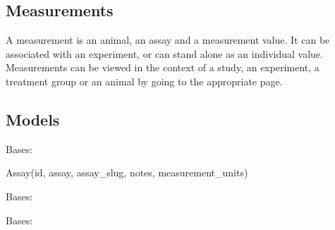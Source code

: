 \documentclass[letterpaper,10pt,english]{sphinxmanual}
\begin{document}
\subsection{Measurements}
\label{api:measurements}
A measurement is an animal, an assay and a measurement value.  It can be associated with an experiment, or can stand alone as an individual value.  Measurements can be viewed in the context of a study, an experiment, a treatment group or an animal by going to the appropriate page.


\subsection{Models}
\label{api:module-mousedb.data.models}\label{api:models}

\begin{fulllineitems}
\label{api:mousedb.data.models.Assay}
Bases: 

Assay(id, assay, assay\_slug, notes, measurement\_units)

\begin{fulllineitems}
\label{api:mousedb.data.models.Assay.DoesNotExist}
Bases: 

\end{fulllineitems}


\begin{fulllineitems}
\label{api:mousedb.data.models.Assay.MultipleObjectsReturned}
Bases: 

\end{fulllineitems}


\begin{fulllineitems}
\label{api:mousedb.data.models.Assay.measurement_set}
\end{fulllineitems}


\begin{fulllineitems}
\label{api:mousedb.data.models.Assay.objects}
\end{fulllineitems}


\end{fulllineitems}
\end{document}
